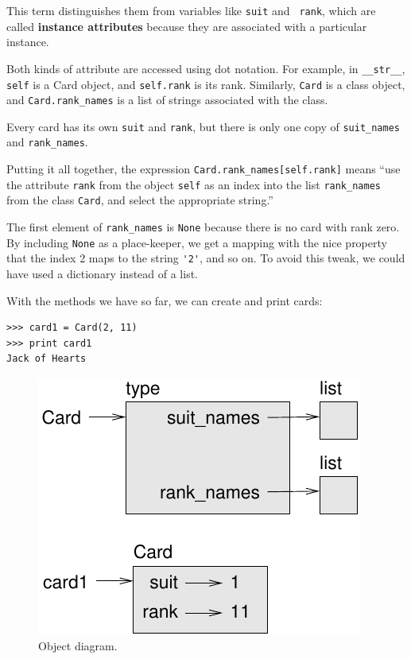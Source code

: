 \documentclass[10pt]{book}
\begin{document}
This term distinguishes them from variables like {\tt suit} and {\tt
  rank}, which are called {\bf instance attributes} because they are
associated with a particular instance.

Both kinds of attribute are accessed using dot notation.  For
example, in \verb"__str__", {\tt self} is a Card object,
and {\tt self.rank} is its rank.  Similarly, {\tt Card}
is a class object, and \verb"Card.rank_names" is a
list of strings associated with the class.

Every card has its own {\tt suit} and {\tt rank}, but there
is only one copy of \verb"suit_names" and \verb"rank_names".

Putting it all together, the expression
\verb"Card.rank_names[self.rank]" means ``use the attribute {\tt rank}
from the object {\tt self} as an index into the list \verb"rank_names"
from the class {\tt Card}, and select the appropriate string.''

The first element of \verb"rank_names" is {\tt None} because there
is no card with rank zero.  By including {\tt None} as a place-keeper,
we get a mapping with the nice property that the index 2 maps to the
string \verb"'2'", and so on.  To avoid this tweak, we could have
used a dictionary instead of a list.

With the methods we have so far, we can create and print cards:

\begin{verbatim}
>>> card1 = Card(2, 11)
>>> print card1
Jack of Hearts
\end{verbatim}

\begin{figure}
\centerline
{\includegraphics[scale=0.8]{figs/card1.pdf}}
\caption{Object diagram.}
\label{fig.card1}
\end{figure}
\end{document}
